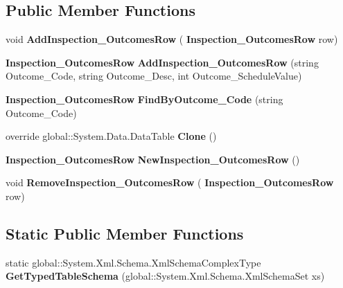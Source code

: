\subsection*{Public Member Functions}
\begin{DoxyCompactItemize}
\item 
\mbox{\label{class_a_f_h___scheduler_1_1_home_inspection_db_data_set_1_1_inspection___outcomes_data_table_a7d7458473bfd87ec6d33ee45eaa81153}} 
void {\bfseries Add\+Inspection\+\_\+\+Outcomes\+Row} (\textbf{ Inspection\+\_\+\+Outcomes\+Row} row)
\item 
\mbox{\label{class_a_f_h___scheduler_1_1_home_inspection_db_data_set_1_1_inspection___outcomes_data_table_a89afd57b51c0b472f9521048627e88a3}} 
\textbf{ Inspection\+\_\+\+Outcomes\+Row} {\bfseries Add\+Inspection\+\_\+\+Outcomes\+Row} (string Outcome\+\_\+\+Code, string Outcome\+\_\+\+Desc, int Outcome\+\_\+\+Schedule\+Value)
\item 
\mbox{\label{class_a_f_h___scheduler_1_1_home_inspection_db_data_set_1_1_inspection___outcomes_data_table_a5965372bf4a03c476df25798a983239c}} 
\textbf{ Inspection\+\_\+\+Outcomes\+Row} {\bfseries Find\+By\+Outcome\+\_\+\+Code} (string Outcome\+\_\+\+Code)
\item 
\mbox{\label{class_a_f_h___scheduler_1_1_home_inspection_db_data_set_1_1_inspection___outcomes_data_table_a8b59e4f11dc66951a433189ecf2a6ca6}} 
override global\+::\+System.\+Data.\+Data\+Table {\bfseries Clone} ()
\item 
\mbox{\label{class_a_f_h___scheduler_1_1_home_inspection_db_data_set_1_1_inspection___outcomes_data_table_ace09218e73400f055e3921eb86c06136}} 
\textbf{ Inspection\+\_\+\+Outcomes\+Row} {\bfseries New\+Inspection\+\_\+\+Outcomes\+Row} ()
\item 
\mbox{\label{class_a_f_h___scheduler_1_1_home_inspection_db_data_set_1_1_inspection___outcomes_data_table_aedea9caf8b9705a47056fbb8c5a97429}} 
void {\bfseries Remove\+Inspection\+\_\+\+Outcomes\+Row} (\textbf{ Inspection\+\_\+\+Outcomes\+Row} row)
\end{DoxyCompactItemize}
\subsection*{Static Public Member Functions}
\begin{DoxyCompactItemize}
\item 
\mbox{\label{class_a_f_h___scheduler_1_1_home_inspection_db_data_set_1_1_inspection___outcomes_data_table_a574270f40d8a3cff4dd8f90780112357}} 
static global\+::\+System.\+Xml.\+Schema.\+Xml\+Schema\+Complex\+Type {\bfseries Get\+Typed\+Table\+Schema} (global\+::\+System.\+Xml.\+Schema.\+Xml\+Schema\+Set xs)
\end{DoxyCompactItemize}
